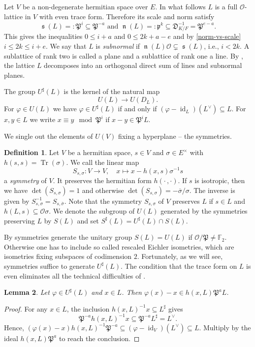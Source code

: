 \documentclass[a4paper]{amsart}
\theoremstyle{definition}
\newtheorem{definition}{Definition}[section]
\theoremstyle{plain}
\newtheorem{lemma}[definition]{Lemma}
\DeclareMathOperator{\id}{id}
\DeclareMathOperator{\Tr}{Tr}
\DeclareMathOperator{\scale}{\mathfrak{s}}
\DeclareMathOperator{\norm}{\mathfrak{n}}
\newcommand{\FF}{\mathbb{F}}
\renewcommand{\O}{\mathcal{O}}
\newcommand{\fp}{\mathfrak{p}}
\newcommand{\FP}{\mathfrak{P}}
\newcommand{\FD}{\mathfrak{D}}
\newcommand{\disc}[1]{{D_{#1}}}
\newcommand{\sprod}[2]{h( #1, #2)}
\newcommand{\sprodq}[2]{h( #1,#1)}
\begin{document}
Let $V$ be a non-degenerate hermitian space over $E$.
%
In what follows $L$ is a full $\O$-lattice in $V$ with even trace form.
Therefore its scale and norm satisfy
\[\scale(L)=:\FP^i\subseteq \FP^{-a}\text{ and }\norm(L)=:\fp^k\subseteq \FD_{K/F}^{-1} = \FP^{e-a}.\]
This gives the inequalities $0 \leq i+a$ and $0 \leq 2k+a-e$ and by \cref{norm-vs-scale} $i \leq 2k \leq i+e$.
We say that $L$ is \emph{subnormal} if $\norm(L)\O\subsetneq \scale(L)$, i.e., $i<2k$. A sublattice of rank two is called a plane and a sublattice of rank one a line.
By \cite[Propositions 4.3, 4.4]{Jacobowitz1962}, the lattice $L$ decomposes into an orthogonal direct sum of lines and subnormal planes.

The group $U^\sharp(L)$ is the kernel of the natural map
\[U(L) \rightarrow U(\disc{L}).\]
For $\varphi \in U(L)$ we have $\varphi \in U^\sharp(L)$ if and only if $(\varphi - \id_L)(L^\vee) \subseteq L$.
For $x,y \in L$ we write $x \equiv y \mod \FP^i$ if $x-y \in \FP^i L$.

We single out the elements of $U(V)$ fixing a hyperplane -- the symmetries.
\begin{definition}
  Let $V$ be a hermitian space, $s \in V$ and $\sigma \in E^\times$ with $\sprodq{s}{s}=\Tr(\sigma)$. We call the linear map
  \[S_{s,\sigma} \colon V \to V, \quad x \mapsto x -\sprod x s \sigma^{-1}s\]
  a \emph{symmetry} of $V$. It preserves the hermitian form $\sprod{\cdot\,}{\cdot}$.
  If $s$ is isotropic, then we have $\det(S_{s, \sigma}) = 1$ and
  otherwise $\det(S_{s,\sigma})=-\overline\sigma/\sigma$.
  The inverse is given by $S_{s,\sigma}^{-1}=S_{s,\bar \sigma}$.
  Note that the symmetry $S_{s, \sigma}$ of $V$ preserves $L$
  if $s \in L$ and $\sprod L s \subseteq \O \sigma$.
  We denote the subgroup of $U(L)$ generated by the symmetries preserving $L$ by $S(L)$ and set $S^\sharp(L) = U^\sharp(L) \cap S(L)$.
 \end{definition}
%

By \cite{brandhorsthofmann2021} symmetries generate the unitary group $S(L)=U(L)$ if $\O/\FP \neq \FF_2$. Otherwise one has to include so called rescaled Eichler isometries, which are isometries fixing subspaces of codimension $2$.
Fortunately, as we will see, symmetries suffice to generate $U^\sharp(L)$. The condition that the trace form on $L$ is even eliminates all the technical difficulties of \cite{brandhorsthofmann2021}.

%
%
%
%
%
%
%
%
%

\begin{lemma}\label{ker:congruence}
 Let $\varphi \in U^\sharp(L)$ and $x \in L$.
  Then $\varphi(x) - x \in \sprod{x}{L} \FP^a L$.
\end{lemma}
\begin{proof}
For any $x \in L$, the inclusion
$\sprod{x}{L}^{-1}x \subseteq L^\sharp$ gives
\[\FP^{-a}\sprod{x}{L}^{-1} x \subseteq \FP^{-a}L^\sharp = L^\vee .\]
  Hence, $(\varphi(x) -x)\sprod{x}{L}^{-1}\FP^{-a} \subseteq (\varphi - \id_V)(L^\vee) \subseteq L$.
  Multiply by the ideal $\sprod{x}{L}\FP^{a}$ to reach the conclusion.
\end{proof}
\end{document}
